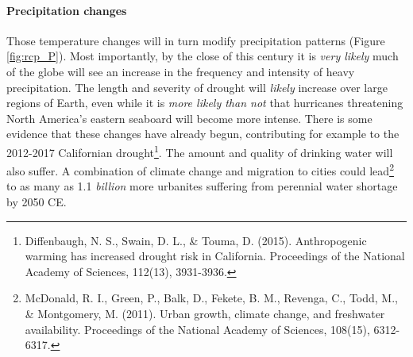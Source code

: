 \paragraph{Precipitation changes}
Those temperature changes will in turn modify precipitation patterns  (Figure \ref{fig:rcp_P}). Most importantly, by the close of this century it is \emph{very likely} much of the globe will see an increase in the frequency and intensity of heavy precipitation. The length and severity of drought will \emph{likely} increase over large regions of Earth, even while it is \emph{more likely than not} that hurricanes threatening North America's eastern seaboard will become more intense. There is some evidence that these changes have already begun, contributing for example to the 2012-2017 Californian drought\footnote{Diffenbaugh, N. S., Swain, D. L., \& Touma, D. (2015). Anthropogenic warming has increased drought risk in California. Proceedings of the National Academy of Sciences, 112(13), 3931-3936.}. The amount and quality of drinking water will also suffer. A combination of climate change and migration to cities could lead\footnote{McDonald, R. I., Green, P., Balk, D., Fekete, B. M., Revenga, C., Todd, M., \& Montgomery, M. (2011). Urban growth, climate change, and freshwater availability. Proceedings of the National Academy of Sciences, 108(15), 6312-6317.} to as many as 1.1 \emph{billion} more urbanites suffering from perennial water shortage  by 2050 CE.   
 

